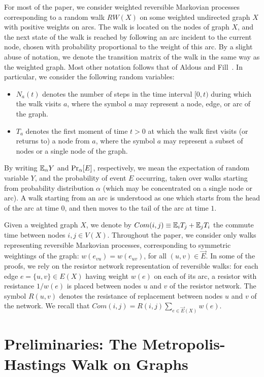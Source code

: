 \documentclass[11pt,a4paper]{article}
\newcommand{\E}{\ensuremath \mathbb E}
\renewcommand{\Pr}{\ensuremath \mathrm {Pr}}
\renewcommand{\*}{\hspace*{5mm}}
\begin{document}
For most of the paper, we consider weighted reversible Markovian processes corresponding to a random walk $RW(X)$ on some weighted undirected graph $X$ with positive weights on arcs. The walk is located on the nodes of graph $X$, and the next state of the walk is reached by following an arc incident to the current node, chosen with probability proportional to the weight of this arc. By a slight abuse of notation, we denote the transition matrix of the walk in the same way as the weighted graph. Most other notation follows that of Aldous and Fill~\cite{AF}. In particular, we consider the following random variables:
\begin{itemize}
\item $N_a (t)$ denotes the number of steps in the time interval $[0,t)$ during which the walk visits $a$, where the symbol $a$ may represent a node, edge, or arc of the graph.
\item $T_a$ denotes the first moment of time $t>0$ at which the walk first visits (or returns to) a node from $a$, where the symbol $a$ may represent a subset of nodes or a single node of the graph.
\end{itemize}
By writing $\E_\alpha Y$ and $\Pr_\alpha [E]$, respectively, we mean the expectation of random variable $Y$, and the probability of event $E$ occurring, taken over walks starting from probability distribution $\alpha$ (which may be concentrated on a single node or arc). A walk starting from an arc is understood as one which starts from the head of the arc at time $0$, and then moves to the tail of the arc at time $1$.

Given a weighted graph $X$, we denote by $Com(i,j) \equiv \E_i T_j + \E_j T_i$ the commute time between nodes $i,j \in V(X)$. Throughout the paper, we consider only walks representing reversible Markovian processes, corresponding to symmetric weightings of the graph: $w(e_{vu}) = w(e_{uv})$, for all $(u,v)\in \vec E$. In some of the proofs, we rely on the resistor network representation of reversible walks: for each edge $e=\{u,v\} \in E(X)$ having weight $w(e)$ on each of its arc, a resistor with resistance $1/w(e)$ is placed between nodes $u$ and $v$ of the resistor network. The symbol $R(u,v)$ denotes the resistance of replacement between nodes $u$ and $v$ of the network. We recall that $Com(i,j) = R(i,j)\sum_{e\in \vec E(X)}w(e)$.~\cite{CRRST}

\section{Preliminaries: The Metropolis-Hastings Walk on Graphs}\label{sec2}\label{sec22}
\end{document}
